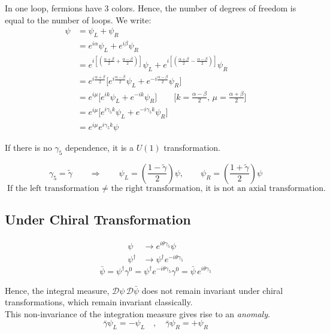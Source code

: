 \documentclass[14pt]{article} %
\begin{document}
In one loop, fermions have $3$ colors. Hence, the number of degrees of freedom is equal to the number of loops.
We write:
\begin{align*}
\psi &= \psi_L + \psi_R 
\\
&= e^{i\alpha}\psi_L + e^{i\beta}\psi_R 
 \\
&= e^{i\left[\left(\frac{\alpha+\beta}{2} + \frac{\alpha-\beta}{2 }\right) \right]} \psi_L 
  + e^{i\left[\left(\frac{\alpha+\beta}{2} - \frac{\alpha-\beta}{2 }\right) \right]} \psi_R 
\\
&= e^{i\frac{\alpha+\beta }{2}} \Big[e^{i\frac{\alpha-\beta }{2}} \psi_L + e^{-i\frac{\alpha-\beta }{2}}\psi_R \Big] 
\\
&= e^{i\mu} \Big[e^{i k} \psi_L + e^{-ik}\psi_R \Big] \qquad \big  [k = \frac{\alpha-\beta }{2},\, \mu =\frac{\alpha+\beta }{2} \big]
\\
&= e^{i\mu} \Big[e^{i \gamma_5 k} \psi_L + e^{-i \gamma_5 k} \psi_R
\Big] 
\\
&= e^{i\mu} e^{i \gamma_5 k} \psi
\end{align*}

If there is no $\gamma_5$ dependence, it is a $U(1)$ transformation.

\[
\gamma_5 = \tilde{\gamma}
\qquad\Rightarrow\qquad
\psi_L = 
\left(
\frac{1 - \tilde{\gamma}}{2}
\right)\psi,
\qquad
\psi_R =
\left(
\frac{1 + \tilde{\gamma}}{2}
\right)\psi
\]
\[
\boxed{
\text{If the left transformation } \neq \text{ the right transformation, it is not an axial transformation.}
}
\]

\subsection*{Under Chiral Transformation}
\begin{align*}
\psi &\to e^{i \theta \gamma_5}\psi \\
\psi^\dagger &\to \psi^\dagger e^{- i \theta \gamma_5}
\end{align*}
\[
\bar{\psi}
= \psi^\dagger \gamma^0
=
\psi^\dagger e^{-i\theta\gamma_5}\gamma^0
= \bar{\psi}\, e^{i\theta\gamma_5}
\]

Hence, the integral measure,
\(
\mathcal{D}\psi \, \mathcal{D}\bar{\psi}
\)
does not remain invariant under chiral transformations, which remain invariant classically.\\

This non-invariance of the integration measure gives rise to an \textit{anomaly}.
\[
\bar \gamma \psi_L = -\psi_L \quad,\quad
\bar\gamma \psi_R = +\psi_R
\]
\end{document}
